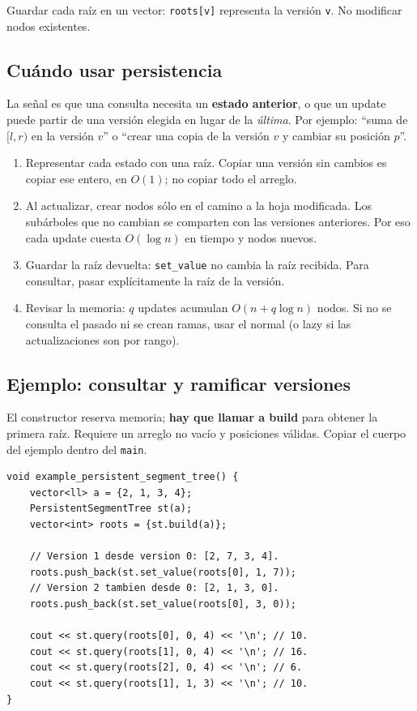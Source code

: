 Guardar cada ra\'iz en un vector: \texttt{roots[v]} representa la versi\'on
\texttt{v}. No modificar nodos existentes.

\subsection{Cu\'ando usar persistencia}
La se\~nal es que una consulta necesita un \textbf{estado anterior}, o que
un update puede partir de una versi\'on elegida en lugar de la \textit{\'ultima}.
Por ejemplo: ``suma de $[l,r)$ en la versi\'on $v$'' o ``crear una copia
de la versi\'on $v$ y cambiar su posici\'on $p$''.

\begin{enumerate}
\item Representar cada estado con una ra\'iz. Copiar una versi\'on sin
cambios es copiar ese entero, en $O(1)$; no copiar todo el arreglo.
\item Al actualizar, crear nodos s\'olo en el camino a la hoja modificada.
Los sub\'arboles que no cambian se comparten con las versiones anteriores.
Por eso cada update cuesta $O(\log n)$ en tiempo y nodos nuevos.
\item Guardar la ra\'iz devuelta: \texttt{set\_value} no cambia la ra\'iz
recibida. Para consultar, pasar expl\'icitamente la ra\'iz de la versi\'on.
\item Revisar la memoria: $q$ updates acumulan $O(n+q\log n)$ nodos.
Si no se consulta el pasado ni se crean ramas, usar el normal (o lazy
si las actualizaciones son por rango).
\end{enumerate}

\subsection{Ejemplo: consultar y ramificar versiones}
El constructor reserva memoria; \textbf{hay que llamar a build} para
obtener la primera ra\'iz. Requiere un arreglo no vac\'io y posiciones
v\'alidas. Copiar el cuerpo del ejemplo dentro del \texttt{main}.

\begin{lstlisting}[style=cpp]
void example_persistent_segment_tree() {
    vector<ll> a = {2, 1, 3, 4};
    PersistentSegmentTree st(a);
    vector<int> roots = {st.build(a)};

    // Version 1 desde version 0: [2, 7, 3, 4].
    roots.push_back(st.set_value(roots[0], 1, 7));
    // Version 2 tambien desde 0: [2, 1, 3, 0].
    roots.push_back(st.set_value(roots[0], 3, 0));

    cout << st.query(roots[0], 0, 4) << '\n'; // 10.
    cout << st.query(roots[1], 0, 4) << '\n'; // 16.
    cout << st.query(roots[2], 0, 4) << '\n'; // 6.
    cout << st.query(roots[1], 1, 3) << '\n'; // 10.
}
\end{lstlisting}


